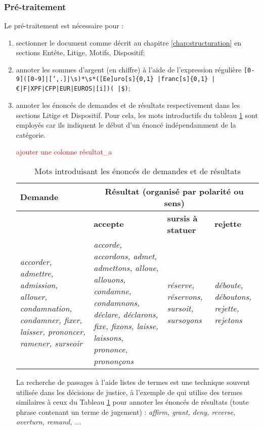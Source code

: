 \subsubsection{Pré-traitement}

Le pré-traitement est nécessaire pour :
\begin{enumerate}
	\item sectionner le document comme décrit au chapitre \ref{chap:structuration} en sections Entête, Litige, Motifs, Dispositif;
	\item annoter les sommes d'argent (en chiffre) à l'aide de l'expression régulière \og \texttt{[0-9]([0-9]|[',.]|\textbackslash s)*\textbackslash s*([Ee]uro[s]\{0,1\} |franc[s]\{0,1\} |\euro|F|XPF|CFP|EUR|EUROS|[i])( |\$)}\fg{};
	\item annoter les énoncés de demandes et de résultats respectivement dans les sections Litige et Dispositif. Pour cela, les mots introductifs du tableau \ref{tab:quanta:mots-introductifs} sont employés car ils indiquent le début d'un énoncé indépendamment de la catégorie.
	 
	\begin{table}[!htb]
		\centering
		\scriptsize
		\textcolor{red}{ajouter une colonne résultat\_a}
		\begin{tabular}{|p{}|p{}|p{}|p{}|}
			\hline
			\textbf{Demande} & \multicolumn{3}{c|}{\textbf{Résultat} (organisé par polarité ou sens)} \\ \hline
			& \textbf{accepte}  &\textbf{sursis à statuer} & \textbf{rejette}  \\ \hline
			\textit{accorder, admettre, admission, allouer, condamnation, condamner, fixer, laisser, prononcer, ramener, surseoir} & \textit{accorde, accordons, admet, admettons, alloue, allouons, condamne, condamnons, déclare, déclarons, fixe, fixons, laisse, laissons, prononce, prononçons} & \textit{réserve, réservons, sursoit, sursoyons} & \textit{déboute, déboutons, rejette, rejetons} \\ \hline
		\end{tabular}
		\caption{Mots introduisant les énoncés de demandes et de résultats}\label{tab:quanta:mots-introductifs}
	\end{table}

	La recherche de passages à l'aide listes de termes est une technique souvent utilisée dans les décisions de justice, à l'exemple de \cite{wyner2010extractlegalelts} qui utilise des termes similaires à ceux du Tableau \ref{tab:quanta:mots-introductifs} pour annoter les énoncés de résultats (toute phrase contenant un terme de jugement) : \textit{affirm, grant, deny, reverse, overturn, remand, ...}
\end{enumerate} 

